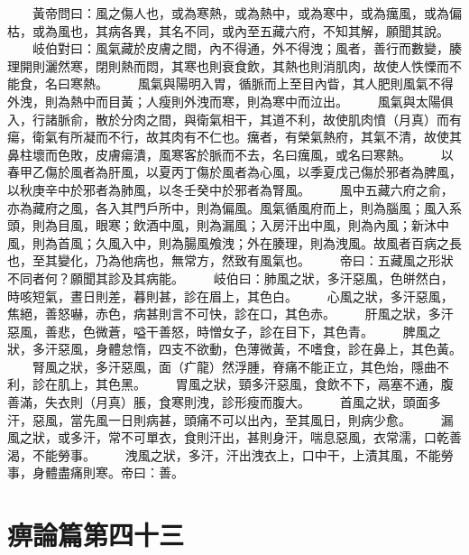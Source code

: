 　　黃帝問曰：風之傷人也，或為寒熱，或為熱中，或為寒中，或為癘風，或為偏枯，或為風也，其病各異，其名不同，或內至五藏六府，不知其解，願聞其說。
　　岐伯對曰：風氣藏於皮膚之間，內不得通，外不得洩；風者，善行而數變，腠理開則灑然寒，閉則熱而悶，其寒也則衰食飲，其熱也則消肌肉，故使人怢慄而不能食，名曰寒熱。
　　風氣與陽明入胃，循脈而上至目內眥，其人肥則風氣不得外洩，則為熱中而目黃；人瘦則外洩而寒，則為寒中而泣出。
　　風氣與太陽俱入，行諸脈俞，散於分肉之間，與衛氣相干，其道不利，故使肌肉憤（月真）而有瘍，衛氣有所凝而不行，故其肉有不仁也。癘者，有榮氣熱府，其氣不清，故使其鼻柱壞而色敗，皮膚瘍潰，風寒客於脈而不去，名曰癘風，或名曰寒熱。
　　以春甲乙傷於風者為肝風，以夏丙丁傷於風者為心風，以季夏戊己傷於邪者為脾風，以秋庚辛中於邪者為肺風，以冬壬癸中於邪者為腎風。
　　風中五藏六府之俞，亦為藏府之風，各入其門戶所中，則為偏風。風氣循風府而上，則為腦風；風入系頭，則為目風，眼寒；飲酒中風，則為漏風；入房汗出中風，則為內風；新沐中風，則為首風；久風入中，則為腸風飧洩；外在腠理，則為洩風。故風者百病之長也，至其變化，乃為他病也，無常方，然致有風氣也。
　　帝曰：五藏風之形狀不同者何？願聞其診及其病能。
　　岐伯曰：肺風之狀，多汗惡風，色皏然白，時咳短氣，晝日則差，暮則甚，診在眉上，其色白。
　　心風之狀，多汗惡風，焦絕，善怒嚇，赤色，病甚則言不可快，診在口，其色赤。
　　肝風之狀，多汗惡風，善悲，色微蒼，嗌干善怒，時憎女子，診在目下，其色青。
　　脾風之狀，多汗惡風，身體怠惰，四支不欲動，色薄微黃，不嗜食，診在鼻上，其色黃。
　　腎風之狀，多汗惡風，面（疒龍）然浮腫，脊痛不能正立，其色炲，隱曲不利，診在肌上，其色黑。
　　胃風之狀，頸多汗惡風，食飲不下，鬲塞不通，腹善滿，失衣則（月真）脹，食寒則洩，診形瘦而腹大。
　　首風之狀，頭面多汗，惡風，當先風一日則病甚，頭痛不可以出內，至其風日，則病少愈。
　　漏風之狀，或多汗，常不可單衣，食則汗出，甚則身汗，喘息惡風，衣常濡，口乾善渴，不能勞事。
　　洩風之狀，多汗，汗出洩衣上，口中干，上漬其風，不能勞事，身體盡痛則寒。帝曰：善。


\section{痹論篇第四十三}

